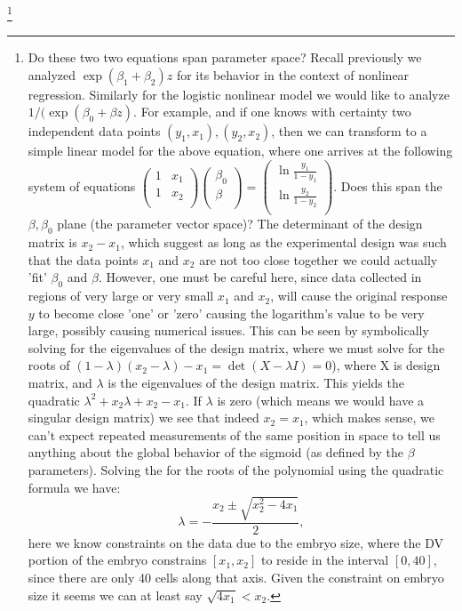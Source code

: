 \footnote{Do these two two equations span parameter space?  Recall previously we analyzed $\exp{(\beta_1 +\beta_2) z}$ for its behavior in the context of nonlinear regression.  Similarly for the logistic nonlinear model we would like to analyze $1/(\exp{(\beta_0 +\beta z)}$.  For example, and if one knows with certainty two independent data points $(y_1, x_1), (y_2,x_2)$, then we can transform to a simple linear model for the above equation, where one arrives at the following system of equations $\begin{pmatrix}  1&x_1\\ 1 & x_2\\ \end{pmatrix} \begin{pmatrix} \beta_0\\ \beta \\ \end{pmatrix} = \begin{pmatrix} \ln{\frac{y_1}{1-y_1}}\\ \ln{\frac{y_2}{1-y_2}} \\ \end{pmatrix} $.  Does this span the $\beta,\beta_0$ plane (the parameter vector space)?  The determinant of the design matrix is $x_2-x_1$, which suggest as long as the experimental design was such that the data points $x_1$ and $x_2$ are not too close together we could actually 'fit' $\beta_0$ and $\beta$.  However, one must be careful here, since data collected in regions of very large or very small $x_1$ and $x_2$, will cause the original response $y$ to become close 'one' or 'zero' causing the logarithm's value to be very large, possibly causing numerical issues.  This can be seen by symbolically solving for the eigenvalues of the design matrix, where we must solve for the roots of $(1-\lambda)(x_2-\lambda)-x_1=\det(X-\lambda I)=0$), where X is design matrix, and $\lambda$ is the eigenvalues of the design matrix.  This yields the quadratic $\lambda^2 +x_2\lambda+x_2-x_1$.  If $\lambda$ is zero (which means we would have a singular design matrix) we see that indeed $x_2=x_1$, which makes sense, we can't expect repeated measurements of the same position in space to tell us anything about the global behavior of the sigmoid (as defined by the $\beta$ parameters).  Solving the for the roots of the polynomial using the quadratic formula we have:
\begin{equation}
\lambda=-\frac{x_2 \pm \sqrt{x_2^2-4x_1}}{2},
\end{equation}
here we know constraints on the data due to the embryo size, where the DV portion of the embryo constrains $[x_1,x_2]$ to reside in the interval $[0,40]$, since there are only 40 cells along that axis.  Given the constraint on embryo size it seems we can at least say $\sqrt{4x_1}<x_2$.}


